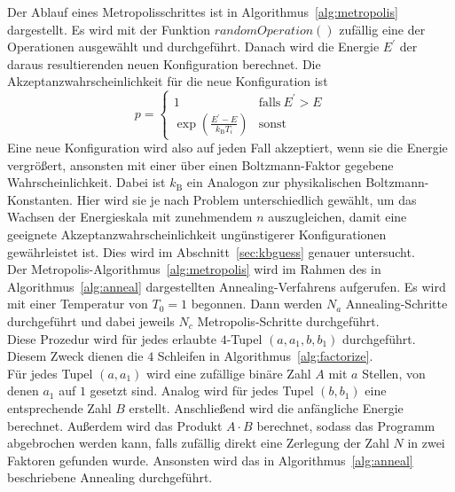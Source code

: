 Der Ablauf eines Metropolisschrittes ist in Algorithmus~\ref{alg:metropolis} dargestellt. Es wird mit der Funktion $\mathrm{\textit{randomOperation}}\left(\right)$ zufällig eine der Operationen ausgewählt und durchgeführt. Danach wird die Energie $E^\prime$ der daraus resultierenden neuen Konfiguration berechnet. Die Akzeptanzwahrscheinlichkeit für die neue Konfiguration ist
\begin{equation}
		p=\begin{cases}
				1 & \mathrm{falls}\: E^\prime > E \\
				\exp\left(\frac{E^\prime-E}{k_\mathrm{B} T_i}\right) & \mathrm{sonst}
		\end{cases}\label{eq:accept}
\end{equation}
Eine neue Konfiguration wird also auf jeden Fall akzeptiert, wenn sie die Energie vergrößert, ansonsten mit einer über einen Boltzmann-Faktor gegebene Wahrscheinlichkeit. Dabei ist $k_\mathrm{B}$ ein Analogon zur physikalischen Boltzmann-Konstanten. Hier wird sie je nach Problem unterschiedlich gewählt, um das Wachsen der Energieskala mit zunehmendem $n$ auszugleichen, damit eine geeignete Akzeptanzwahrscheinlichkeit ungünstigerer Konfigurationen gewährleistet ist. Dies wird im Abschnitt~\ref{sec:kbguess} genauer untersucht. \\
Der Metropolis-Algorithmus~\ref{alg:metropolis} wird im Rahmen des in Algorithmus~\ref{alg:anneal} dargestellten Annealing-Verfahrens aufgerufen. Es wird mit einer Temperatur von $T_0=1$ begonnen. Dann werden $N_a$ Annealing-Schritte durchgeführt und dabei jeweils $N_c$ Metropolis-Schritte durchgeführt. \\
Diese Prozedur wird für jedes erlaubte $4$-Tupel $\left(a,a_1,b,b_1\right)$ durchgeführt. Diesem Zweck dienen die $4$ Schleifen in Algorithmus~\ref{alg:factorize}. \\
Für jedes Tupel $\left(a,a_1\right)$ wird eine zufällige binäre Zahl $A$ mit $a$ Stellen, von denen $a_1$ auf $1$ gesetzt sind. Analog wird für jedes Tupel $\left(b,b_1\right)$ eine entsprechende Zahl $B$ erstellt. Anschließend wird die anfängliche Energie berechnet. Außerdem wird das Produkt $A\cdot B$ berechnet, sodass das Programm abgebrochen werden kann, falls zufällig direkt eine Zerlegung der Zahl $N$ in zwei Faktoren gefunden wurde. Ansonsten wird das in Algorithmus~\ref{alg:anneal} beschriebene Annealing durchgeführt.



\FloatBarrier{}

